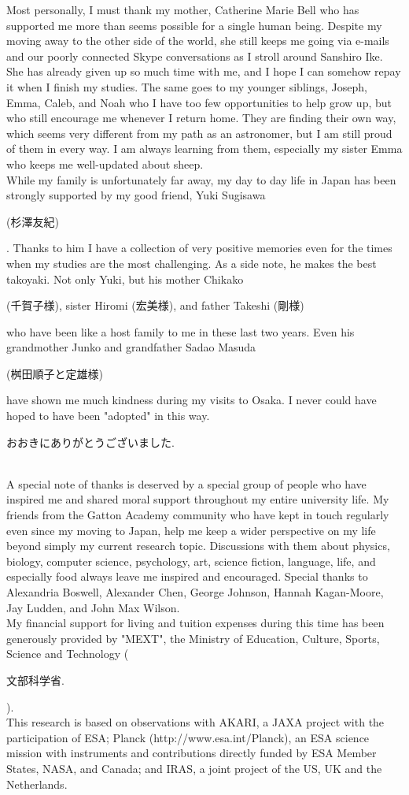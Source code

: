      Most personally, I must thank my mother, Catherine Marie Bell who has supported me more than seems possible for a single human being. Despite my moving away to the other side of the world, she still keeps me going via e-mails and our poorly connected Skype conversations as I stroll around Sanshiro Ike. She has already given up so much time with me, and I hope I can somehow repay it when I finish my studies. The same goes to my younger siblings, Joseph, Emma, Caleb, and Noah who I have too few opportunities to help grow up, but who still encourage me whenever I return home. They are finding their own way, which seems very different from my path as an astronomer, but I am still proud of them in every way. I am always learning from them, especially my sister Emma who keeps me well-updated about sheep.\\
     While my family is unfortunately far away, my day to day life in Japan has been strongly supported by my good friend, Yuki Sugisawa \begin{CJK}{UTF8}{min}(杉澤友紀)\end{CJK}. Thanks to him I have a collection of very positive memories even for the times when my studies are the most challenging. As a side note, he makes the best takoyaki. Not only Yuki, but his mother Chikako \begin{CJK}{UTF8}{min}(千賀子様), sister Hiromi (宏美様), and father Takeshi (剛様)\end{CJK} who have been like a host family to me in these last two years. Even his grandmother Junko  and grandfather Sadao Masuda \begin{CJK}{UTF8}{min}(桝田順子と定雄様)\end{CJK} have shown me much kindness during my visits to Osaka. I never could have hoped to have been "adopted" in this way. \begin{CJK}{UTF8}{min}おおきにありがとうございました.\end{CJK}\\
     A special note of thanks is deserved by a special group of people who have inspired me and shared moral support throughout my entire university life. My friends from the Gatton Academy community who have kept in touch regularly even since my moving to Japan, help me keep a wider perspective on my life beyond simply my current research topic. Discussions with them about physics, biology, computer science, psychology, art, science fiction, language, life, and especially food always leave me inspired and encouraged. Special thanks to Alexandria Boswell, Alexander Chen, George Johnson, Hannah Kagan-Moore, Jay Ludden, and John Max Wilson.\\
     My financial support for living and tuition expenses during this time has been generously provided by "MEXT", the Ministry of Education, Culture, Sports, Science and Technology (\begin{CJK}{UTF8}{min}文部科学省.\end{CJK}). \\
     This research is based on observations with AKARI, a JAXA project with the participation of ESA; Planck (http://www.esa.int/Planck), an ESA science 
mission with instruments and contributions directly funded by ESA Member States, NASA, 
and Canada; and IRAS, a joint project of the US, UK and the Netherlands.